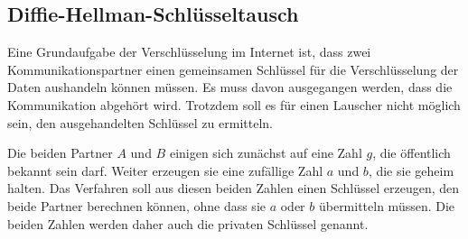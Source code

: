 %


%
%
\subsection{Diffie-Hellman-Schlüsseltausch
\label{buch:subsection:diffie-hellman}}
Eine Grundaufgabe der Verschlüsselung im Internet ist, dass zwei
Kommunikationspartner einen gemeinsamen Schlüssel für die Verschlüsselung
der Daten aushandeln können müssen.
Es muss davon ausgegangen werden, dass die Kommunikation abgehört wird.
Trotzdem soll es für einen Lauscher nicht möglich sein, den 
ausgehandelten Schlüssel zu ermitteln.


Die beiden Partner $A$ und $B$ einigen sich zunächst auf eine Zahl $g$,
die öffentlich bekannt sein darf.
Weiter erzeugen sie eine zufällige Zahl $a$ und $b$, die sie geheim
halten.
Das Verfahren soll aus diesen beiden Zahlen einen Schlüssel erzeugen,
den beide Partner berechnen können, ohne dass sie $a$ oder $b$ 
übermitteln müssen.
Die beiden Zahlen werden daher auch die privaten Schlüssel genannt.

